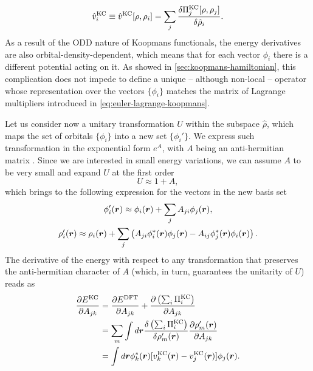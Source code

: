 %
\begin{equation}
    \hat{v}^{\rm KC}_i \equiv \hat{v}^{\rm KC}[\rho,\rho_i] = \sum_j \frac{\delta \Pi_j^{\rm KC}[\rho,\rho_j]}{\delta \hat{\rho}_i} .
    \label{eq:koopmans-ith-potential}
\end{equation}
%
As a result of the ODD nature of Koopmans functionals, the energy derivatives are also orbital-density-dependent, which means that for each vector $\phi_i$ there is a different potential acting on it. As showed in \cref{sec:koopmans-hamiltonian}, this complication does not impede to define a unique -- although non-local -- operator whose representation over the vectors $\{ \phi_i \}$ matches the matrix of Lagrange multipliers introduced in \cref{eq:euler-lagrange-koopmans}.

Let us consider now a unitary transformation $U$ within the subspace $\hat{\rho}$, which maps the set of orbitals $\{ \phi_i \}$ into a new set $\{ \phi_i' \}$. We express such transformation in the exponential form $e^A$, with $A$ being an anti-hermitian matrix \cite{borghi_variational_2015}. Since we are interested in small energy variations, we can assume $A$ to be very small and expand $U$ at the first order
%
\begin{equation}
    U \approx 1 + A ,
    \label{eq:infinitesimal-unitary}
\end{equation}
%
which brings to the following expression for the vectors in the new basis set
%
\begin{equation}
    \begin{gathered}
    \phi_i'({\bm r}) \approx \phi_i({\bm r}) + \sum_j A_{ji} \phi_j({\bm r}) ,\\
    \rho_i'({\bm r}) \approx \rho_i({\bm r}) + \sum_j \left( A_{ji} \phi_i^*({\bm r}) \phi_j({\bm r}) - A_{ij} \phi_j^*({\bm r}) \phi_i({\bm r}) \right) .
    \end{gathered}
    \label{eq:infinitesimal-unitary-orbitals}
\end{equation}
%
The derivative of the energy with respect to any transformation that preserves the anti-hermitian character of $A$ (which, in turn, guarantees the unitarity of $U$) reads as
%
\begin{equation}
    \begin{split}
    \frac{\partial E^{\rm KC}}{\partial A_{jk}} &= \frac{\partial E^{\rm DFT}}{\partial A_{jk}} + \frac{\partial \left( \sum_i \Pi^{\rm KC}_i \right)}{\partial A_{jk}} \\
    &= \sum_{m} \int d{\bm r} \frac{\delta \left( \sum_i \Pi^{\rm KC}_i \right)}{\delta \rho_m'({\bm r})} \frac{\partial \rho_m'({\bm r})}{\partial A_{jk}} \\
    &= \int d{\bm r} \phi_k^*({\bm r}) [ v^{\rm KC}_k({\bm r}) - v^{\rm KC}_j({\bm r}) ] \phi_j({\bm r}) .
    \end{split}
    \label{eq:energy-der-unitary}
\end{equation}
